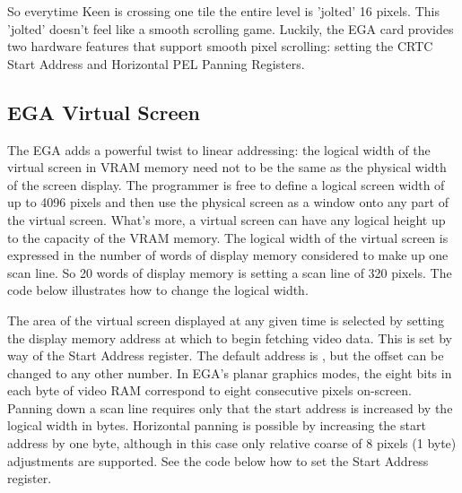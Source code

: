 \documentclass[book.tex]{subfiles}
\begin{document}
So everytime Keen is crossing one tile the entire level is 'jolted' 16 pixels. This 'jolted' doesn't feel like a smooth scrolling game. Luckily, the EGA card provides two hardware features that support smooth pixel scrolling: setting the CRTC Start Address and Horizontal PEL Panning Registers. \\

\subsection{EGA Virtual Screen}

The EGA adds a powerful twist to linear addressing: the logical width of the virtual screen in VRAM memory need not to be the same as the physical width of the screen display. The programmer is free to define a logical screen width of up to 4096 pixels and then use the physical screen as a window onto any part of the virtual screen. What's more, a virtual screen can have any logical height up to the capacity of the VRAM memory. The logical width of the virtual screen is expressed in the number of words of display memory considered to make up one scan line. So 20 words of display memory is setting a scan line of 320 pixels. The code below illustrates how to change the logical width.\\

\begin{minipage}{\textwidth}
  
  \end{minipage}
  \label{ega_pel_pan}
  \par

The area of the virtual screen displayed at any given time is selected by setting the display memory address at which to begin fetching video data. This is set by way of the Start Address register. The default address is , but the offset can be changed to any other number. In EGA's planar graphics modes, the eight bits in each byte of video RAM correspond to eight consecutive pixels on-screen. Panning down a scan line requires only that the start address is increased by the logical width in bytes. Horizontal panning is possible by increasing the start address by one byte, although in this case only relative coarse of 8 pixels (1 byte)  adjustments are supported. See the code below how to set the Start Address register.

\begin{minipage}{\textwidth}
  
  \end{minipage}
  \label{ega_set_address}
  \par
\end{document}
